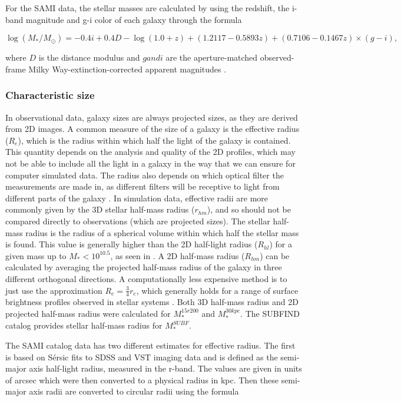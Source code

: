 For the SAMI data, the stellar masses are calculated by using the redshift, the i-band magnitude and g-i color of each galaxy through the formula 

\begin{equation}
	\log(M_*/M_\odot) = -0.4i + 0.4D - \log(1.0+z) + (1.2117 - 0.5893z) + (0.7106 - 0.1467z) \times (g-i), 
\end{equation}

where $D$ is the distance modulus and $g and i$ are the aperture-matched observed-frame Milky Way-extinction-corrected apparent magnitudes \parencite{Bryant2015}.

\subsubsection{Characteristic size}\label{charsize}

In observational data, galaxy sizes are always projected sizes, as they are derived from 2D images. A common measure of the size of a galaxy is the effective radius ($R_e$), which is the radius within which half the light of the galaxy is contained. This quantity depends on the analysis and quality of the 2D profiles, which may not be able to include all the light in a galaxy in the way that we can ensure for computer simulated data. The radius also depends on which optical filter the measurements are made in, as different filters will be receptive to light from different parts of the galaxy \parencite{Sande2018}. In simulation data, effective radii are more commonly given by the 3D stellar half-mass radius ($r_{hm}$), and so should not be compared directly to observations (which are projected sizes). The stellar half-mass radius is the radius of a spherical volume within which half the stellar mass is found. This value is generally higher than the 2D half-light radius ($R_{hl}$) for a given mass up to $M_{*} < 10^{10.5}$, as seen in \textcite{Genel2017}. A 2D half-mass radius ($R_{hm}$) can be calculated by averaging the projected half-mass radius of the galaxy in three different orthogonal directions. A computationally less expensive method is to just use the approximation $R_{e} = \frac{3}{4} r_{e}$, which generally holds for a range of surface brightness profiles observed in stellar systems \parencite{Wolf2010}. Both 3D half-mass radius and 2D projected half-mass radius were calculated for $M_\ast^{15r200}$ and $M_\ast^{30kpc}$. The SUBFIND catalog provides stellar half-mass radius for $M^{SUBF}_*$.

The SAMI catalog data has two different estimates for effective radius. The first is based on Sérsic fits to SDSS and VST imaging data and is defined as the semi-major axis half-light radius, measured in the r-band. The values are given in units of arcsec which were then converted to a physical radius in kpc. Then these semi-major axis radii are converted to circular radii using the formula

